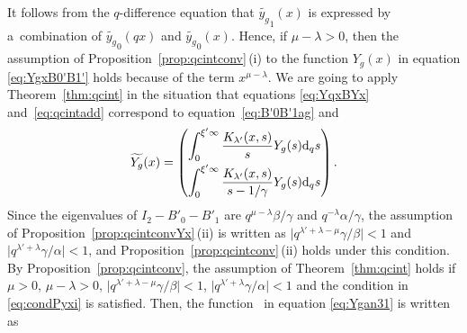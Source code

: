 \documentclass[pdftex]{sigma}
\numberwithin{equation}{section}
\theoremstyle{definition}
\begin{document}
It follows from the $q$-difference equation that $\widetilde{y_g}_{1}(x)$ is expressed by a~combination of $\widetilde{y_g}_{0}(q x) $ and $\widetilde{y_g}_{0}(x) $.
Hence, if $\mu - \lambda >0 $, then the assumption of Proposition~\ref{prop:qcintconv}\,(i) to the function $Y_g(x) $ in equation \eqref{eq:YgxB0'B1'} holds because of the term $x^{\mu - \lambda} $.
We are going to apply Theorem~\ref{thm:qcint} in the situation that equations \eqref{eq:YqxBYx} and~\eqref{eq:qcintadd} correspond to equation~\eqref{eq:B'0B'1ag} and
\begin{equation} \label{eq:Ygan31}
\widetilde{Y_g}(x)
= \begin{pmatrix}
 \displaystyle \int_0^{\xi' \infty} \frac{K_{\lambda'}(x,s)}{s} Y_g (s) {\rm d}_q s \vspace{1mm}\\
 \displaystyle \int_0^{\xi' \infty} \frac{K_{\lambda'}(x,s)}{s - 1/\gamma} Y_g (s) {\rm d}_q s
 \end{pmatrix}.
\end{equation}
Since the eigenvalues of $I_2- B'_0 -B'_1$ are $q^{\mu-\lambda} \beta / \gamma $ and $q^{-\lambda} \alpha /\gamma $, the assumption of Proposition~\ref{prop:qcintconvYx}\,(ii) is written as $\big|q^{\lambda ' + \lambda -\mu } \gamma / \beta \big| <1 $ and $ \big|q^{\lambda ' +\lambda } \gamma / \alpha \big| <1 $, and Proposition~\ref{prop:qcintconv}\,(ii) holds under this condition.
By Proposition~\ref{prop:qcintconv}, the assumption of Theorem~\ref{thm:qcint} holds if $\mu >0$, $\mu - \lambda >0 $, $\big|q^{\lambda ' + \lambda -\mu } \gamma / \beta \big| <1 $, $ \big|q^{\lambda ' +\lambda } \gamma / \alpha \big| <1 $ and the condition in \eqref{eq:condPyxi} is satisfied.
Then, the function~ in equation \eqref{eq:Ygan31} is written as
\end{document}
